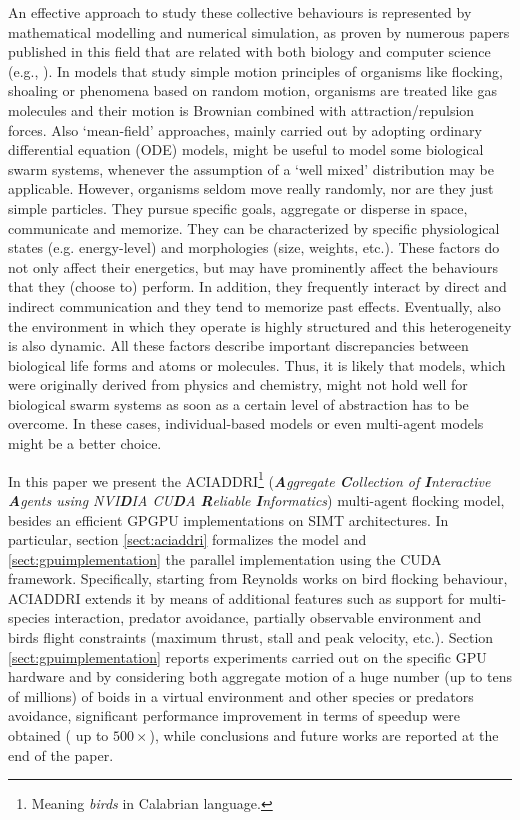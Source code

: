 An effective approach to study these collective behaviours is represented by
mathematical modelling and numerical simulation, as proven by numerous papers
published in this field that are related with both biology and computer
science (e.g., \cite{Schmickl}). In models that study simple motion principles of organisms like flocking, shoaling or phenomena based on random motion, organisms are treated like gas molecules and their motion is
Brownian combined with attraction/repulsion forces. Also ‘mean-field’ approaches, mainly carried out by adopting ordinary differential equation (ODE) models, might be useful to model some biological
swarm systems, whenever the assumption of a ‘well mixed’ distribution may be applicable.
However, organisms seldom move really randomly, nor are they just simple particles. They
pursue specific goals, aggregate or disperse in space, communicate and memorize. They can be characterized by specific physiological states (e.g. energy-level) and morphologies (size, weights, etc.).
These factors do not only affect their energetics, but may have prominently affect the behaviours
that they (choose to) perform. In addition, they frequently interact by direct and indirect
communication and they tend to memorize past effects. Eventually, also the environment
in which they operate is highly structured and this heterogeneity is also dynamic.
All these factors describe important discrepancies between biological life forms
and atoms or molecules. Thus, it is likely that models, which were originally derived from physics and chemistry, might not hold well
for biological swarm systems as soon as a certain level of abstraction has to be overcome.
In these cases, individual-based models or even multi-agent
models \cite{Ferber:1999,Woolridge:2001} might be a better choice.

In this paper we present the
\textsc{ACIADDRI}\footnote{ Meaning \textit{birds} in Calabrian language.} (\emph{\textbf{A}ggregate \textbf{C}ollection of \textbf{I}nteractive \textbf{A}gents using NVI\textbf{D}IA CU\textbf{D}A \textbf{R}eliable \textbf{I}nformatics}) multi-agent flocking model, besides an efficient GPGPU implementations on SIMT architectures. In particular, section \ref{sect:aciaddri}
formalizes the model and \ref{sect:gpuimplementation} the parallel
implementation using the CUDA framework.
Specifically, starting from Reynolds works \cite{Reynolds:1987}\cite{Reynolds:1999}\cite{Reynolds:2000} on bird flocking behaviour, \textsc{ACIADDRI} extends it by means of
additional features such as support for multi-species interaction, predator
avoidance, partially observable environment and birds flight constraints
(maximum thrust, stall and peak velocity, etc.). Section \ref{sect:gpuimplementation} reports experiments carried out on the
specific GPU hardware and by considering both aggregate motion of a huge number (up to tens of millions) of boids in a virtual
environment and other species or predators avoidance, significant performance
improvement in terms of speedup were obtained ( 
up to $ 500\times$), while
conclusions and future works are reported at the end of the paper.




